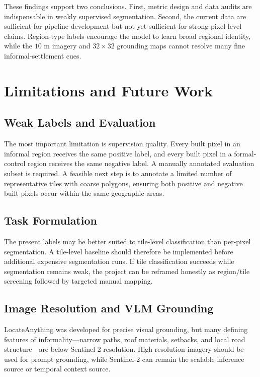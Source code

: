 \documentclass[11pt,a4paper]{article}
\begin{document}
These findings support two conclusions. First, metric design and data audits are indispensable in weakly supervised segmentation. Second, the current data are sufficient for pipeline development but not yet sufficient for strong pixel-level claims. Region-type labels encourage the model to learn broad regional identity, while the \(10\) m imagery and \(32\times32\) grounding maps cannot resolve many fine informal-settlement cues.

\section{Limitations and Future Work}

\subsection{Weak Labels and Evaluation}

The most important limitation is supervision quality. Every built pixel in an informal region receives the same positive label, and every built pixel in a formal-control region receives the same negative label. A manually annotated evaluation subset is required. A feasible next step is to annotate a limited number of representative tiles with coarse polygons, ensuring both positive and negative built pixels occur within the same geographic areas.

\subsection{Task Formulation}

The present labels may be better suited to tile-level classification than per-pixel segmentation. A tile-level baseline should therefore be implemented before additional expensive segmentation runs. If tile classification succeeds while segmentation remains weak, the project can be reframed honestly as region/tile screening followed by targeted manual mapping.

\subsection{Image Resolution and VLM Grounding}

LocateAnything was developed for precise visual grounding, but many defining features of informality---narrow paths, roof materials, setbacks, and local road structure---are below Sentinel-2 resolution. High-resolution imagery should be used for prompt grounding, while Sentinel-2 can remain the scalable inference source or temporal context source.
\end{document}
